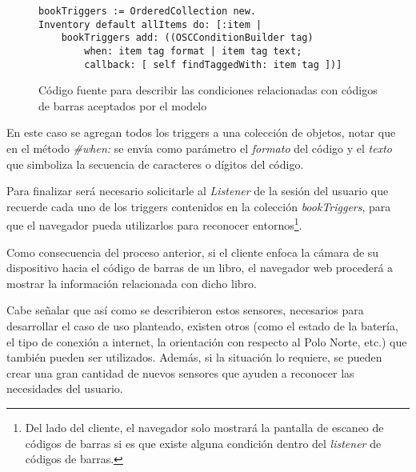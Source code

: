 \begin{figure}[ht!]
\begin{Verbatim}
bookTriggers := OrderedCollection new.
Inventory default allItems do: [:item | 
	bookTriggers add: ((OSCConditionBuilder tag)
		when: item tag format | item tag text;
		callback: [ self findTaggedWith: item tag ])]
\end{Verbatim}
\caption{Código fuente para describir las condiciones relacionadas con códigos de barras aceptados por el modelo}
\label{BarcodeTriggerExample}
\end{figure}

En este caso se agregan todos los triggers a una colección de objetos, notar que en el método \emph{\#when:} se envía como parámetro el \emph{formato} del código y el \emph{texto} que simboliza la secuencia de caracteres o dígitos del código.

Para finalizar será necesario solicitarle al \emph{Listener} de la sesión del usuario que recuerde cada uno de los triggers contenidos en la colección \emph{bookTriggers}, para que el navegador pueda utilizarlos para reconocer entornos\footnote{Del lado del cliente, el navegador solo mostrará la pantalla de escaneo de códigos de barras si es que existe alguna condición dentro del \emph{listener} de códigos de barras.}.

Como consecuencia del proceso anterior, si el cliente enfoca la cámara de su dispositivo hacia el código de barras de un libro, el navegador web procederá a mostrar la información relacionada con dicho libro.

Cabe señalar que así como se describieron estos sensores, necesarios para desarrollar el caso de uso planteado, existen otros (como el estado de la batería, el tipo de conexión a internet, la orientación con respecto al Polo Norte, etc.) que también pueden ser utilizados. Además, si la situación lo requiere, se pueden crear una gran cantidad de nuevos sensores que ayuden a reconocer las necesidades del usuario.